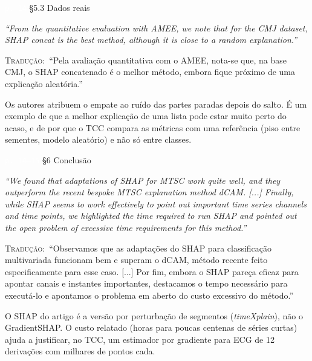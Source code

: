 \documentclass[11pt,a4paper]{article}
\newcommand{\pagechip}[1]{{\setlength{\fboxsep}{1.5pt}\colorbox{cAcc}{\textcolor{white}{\scriptsize\texttt{#1}}}}}
\newenvironment{origquote}{\par\itshape\small}{\par}
\newenvironment{tradquote}{\par\small\textsc{Tradução:}\ }{\par}
\newcommand{\explab}[1]{\par\smallskip{\small\color{cAcc}\textbf{\MakeUppercase{#1}}}\par}
\begin{document}
\begin{citacard}{\pagechip{p. 14} §5.3 Dados reais}
\begin{origquote}“From the quantitative evaluation with AMEE, we note that for the CMJ dataset, SHAP concat is the best method, although it is close to a random explanation.”\end{origquote}
\begin{tradquote}“Pela avaliação quantitativa com o AMEE, nota-se que, na base CMJ, o SHAP concatenado é o melhor método, embora fique próximo de uma explicação aleatória.”\end{tradquote}
\explab{Explicação}
Os autores atribuem o empate ao ruído das partes paradas depois do salto. É um exemplo de que a melhor explicação de uma lista pode estar muito perto do acaso, e de por que o TCC compara as métricas com uma referência (piso entre sementes, modelo aleatório) e não só entre classes.
\end{citacard}

\begin{citacard}{\pagechip{p. 14--15} §6 Conclusão}
\begin{origquote}“We found that adaptations of SHAP for MTSC work quite well, and they outperform the recent bespoke MTSC explanation method dCAM. [...] Finally, while SHAP seems to work effectively to point out important time series channels and time points, we highlighted the time required to run SHAP and pointed out the open problem of excessive time requirements for this method.”\end{origquote}
\begin{tradquote}“Observamos que as adaptações do SHAP para classificação multivariada funcionam bem e superam o dCAM, método recente feito especificamente para esse caso. [...] Por fim, embora o SHAP pareça eficaz para apontar canais e instantes importantes, destacamos o tempo necessário para executá-lo e apontamos o problema em aberto do custo excessivo do método.”\end{tradquote}
\explab{Explicação}
O SHAP do artigo é a versão por perturbação de segmentos (\textit{timeXplain}), não o GradientSHAP. O custo relatado (horas para poucas centenas de séries curtas) ajuda a justificar, no TCC, um estimador por gradiente para ECG de 12 derivações com milhares de pontos cada.
\end{citacard}
\end{document}
